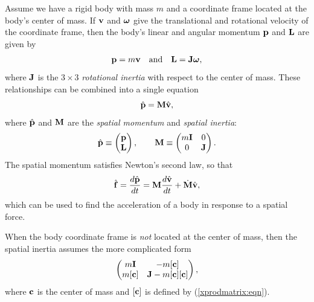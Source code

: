 Assume we have a rigid body with mass $m$ and a coordinate frame
located at the body's center of mass.  If ${\bf v}$ and $\boldsymbol\omega$ give the
translational and rotational velocity of the coordinate frame, then
the body's linear and angular momentum ${\bf p}$ and ${\bf L}$ are given by
%
\begin{equation}
{\bf p} = m {\bf v} \quad \text{and} \quad {\bf L} = {\bf J} \boldsymbol\omega,
\label{momenta:eqn}
\end{equation}
%
where ${\bf J}$ is the $3 \times 3$ {\it rotational inertia} with respect
to the center of mass. These relationships can be combined into a
single equation
%
\begin{equation}
\hat{{\bf p}} = {\bf M} \hat{{\bf v}},
\label{momentum:eqn}
\end{equation}
%
where $\hat{{\bf p}}$ and ${\bf M}$ are the {\it spatial momentum} and
{\it spatial inertia}:
%
\begin{equation}
\hat{{\bf p}} \equiv \left(\begin{matrix} {\bf p} \\ {\bf L} \end{matrix}\right), \qquad
{\bf M} \equiv \left(\begin{matrix} m {\bf I} & 0 \\ 0 & {\bf J} \end{matrix}\right).
\end{equation}
%
The spatial momentum satisfies Newton's second law, so that
%
\begin{equation}
\hat{{\bf f}} = \frac{d \hat{{\bf p}}}{dt} = {\bf M} \frac{d \hat{{\bf v}}}{dt} + \dot{{\bf M}} \hat{{\bf v}},
\end{equation}
%
which can be used to find the acceleration of a body in response to a
spatial force.

When the body coordinate frame is {\it not} located at the center of
mass, then the spatial inertia assumes the more complicated form
%
\begin{equation}
\left(\begin{matrix} 
m {\bf I} & -m [{\bf c}] \\ m [{\bf c}] & {\bf J} - m[{\bf c}][{\bf c}]
\end{matrix}\right),
\end{equation}
%
where ${\bf c}$ is the center of mass and $[{\bf c}]$ is defined by
(\ref{xprodmatrix:eqn}).

